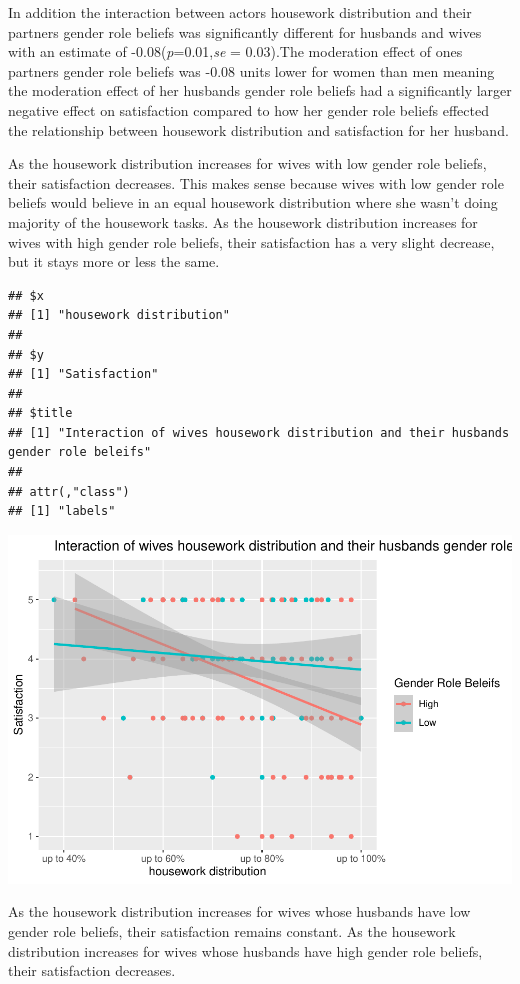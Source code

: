\documentclass[
  english,
  man,floatsintext]{apa6}
\begin{document}
In addition the interaction between actors housework distribution and their partners gender role beliefs was significantly different for husbands and wives with an estimate of -0.08(\emph{p}=0.01,\emph{se} = 0.03).The moderation effect of ones partners gender role beliefs was -0.08 units lower for women than men meaning the moderation effect of her husbands gender role beliefs had a significantly larger negative effect on satisfaction compared to how her gender role beliefs effected the relationship between housework distribution and satisfaction for her husband.



As the housework distribution increases for wives with low gender role beliefs, their satisfaction decreases. This makes sense because wives with low gender role beliefs would believe in an equal housework distribution where she wasn't doing majority of the housework tasks. As the housework distribution increases for wives with high gender role beliefs, their satisfaction has a very slight decrease, but it stays more or less the same.

\begin{verbatim}
## $x
## [1] "housework distribution"
## 
## $y
## [1] "Satisfaction"
## 
## $title
## [1] "Interaction of wives housework distribution and their husbands gender role beleifs"
## 
## attr(,"class")
## [1] "labels"
\end{verbatim}

\includegraphics{results_files/figure-latex/unnamed-chunk-11-1.pdf}

As the housework distribution increases for wives whose husbands have low gender role beliefs, their satisfaction remains constant. As the housework distribution increases for wives whose husbands have high gender role beliefs, their satisfaction decreases.
\end{document}
